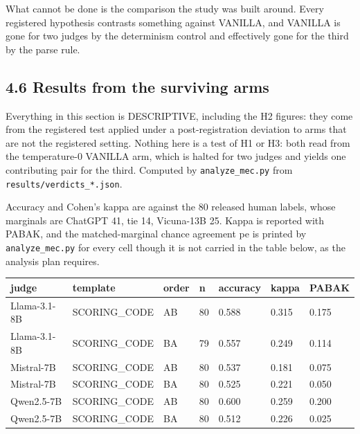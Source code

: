 What cannot be done is the comparison the study was built around. Every registered hypothesis
contrasts something against VANILLA, and VANILLA is gone for two judges by the determinism control
and effectively gone for the third by the parse rule.

\subsection{4.6 Results from the surviving arms}\label{results-from-the-surviving-arms}

Everything in this section is DESCRIPTIVE, including the H2 figures: they come from the registered
test applied under a post-registration deviation to arms that are not the registered setting. Nothing here is a test of H1 or H3: both read from the temperature-0 VANILLA arm,
which is halted for two judges and yields one contributing pair for the third. Computed by \texttt{analyze\_mec.py} from
\texttt{results/verdicts\_*.json}.

Accuracy and Cohen's kappa are against the 80 released human labels, whose marginals are ChatGPT 41,
tie 14, Vicuna-13B 25. Kappa is reported with PABAK, and the matched-marginal chance agreement pe is printed by
\texttt{analyze\_mec.py} for every cell though it is not carried in the table below, as
the analysis plan requires.

{\def\LTcaptype{none} %
\begin{longtable}[]{@{}lllllll@{}}
\toprule\noalign{}
judge & template & order & n & accuracy & kappa & PABAK \\
\midrule\noalign{}
\endhead
\bottomrule\noalign{}
\endlastfoot
Llama-3.1-8B & SCORING\_CODE & AB & 80 & 0.588 & 0.315 & 0.175 \\
Llama-3.1-8B & SCORING\_CODE & BA & 79 & 0.557 & 0.249 & 0.114 \\
Mistral-7B & SCORING\_CODE & AB & 80 & 0.537 & 0.181 & 0.075 \\
Mistral-7B & SCORING\_CODE & BA & 80 & 0.525 & 0.221 & 0.050 \\
Qwen2.5-7B & SCORING\_CODE & AB & 80 & 0.600 & 0.259 & 0.200 \\
Qwen2.5-7B & SCORING\_CODE & BA & 80 & 0.512 & 0.226 & 0.025 \\
\end{longtable}
}

